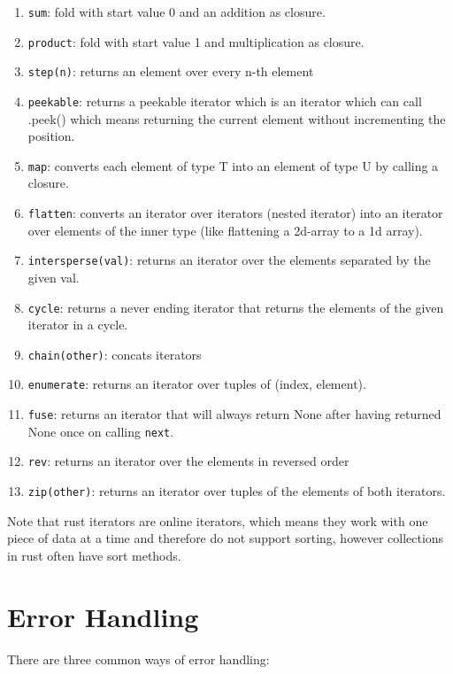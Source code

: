 \begin{enumerate}
        \item \lstinline{sum}: fold with start value 0 and an addition as closure.
        \item \lstinline{product}: fold with start value 1 and multiplication as closure.
        \item \lstinline{step(n)}: returns an element over every n-th element
        \item \lstinline{peekable}: returns a peekable iterator which is an iterator which can call .peek() which means returning the current element without incrementing the position.
        \item \lstinline{map}: converts each element of type T into an element of type U by calling a closure.
        \item \lstinline{flatten}: converts an iterator over iterators (nested iterator) into an iterator over elements of the inner type (like flattening a 2d-array to a 1d array).
        \item \lstinline{intersperse(val)}: returns an iterator over the elements separated by the given val.
        \item \lstinline{cycle}: returns a never ending iterator that returns the elements of the given iterator in a cycle.
        \item \lstinline{chain(other)}: concats iterators
        \item \lstinline{enumerate}: returns an iterator over tuples of (index, element).
        \item \lstinline{fuse}: returns an iterator that will always return None after having returned None once on calling \lstinline{next}.
        \item \lstinline{rev}: returns an iterator over the elements in reversed order
        \item \lstinline{zip(other)}: returns an iterator over tuples of the elements of both iterators.
    \end{enumerate}

    Note that rust iterators are online iterators, which means they work with one piece of data at a time and therefore do not support sorting, however collections in rust often have sort methods.

    \section{Error Handling}

    There are three common ways of error handling:

